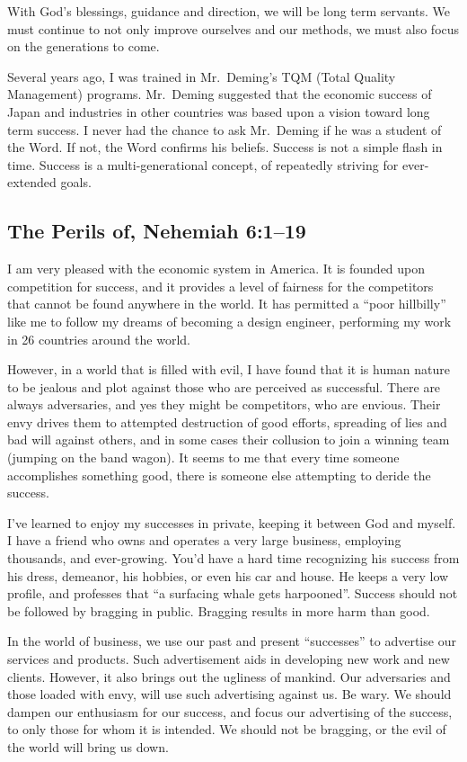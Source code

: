 \documentclass[12pt]{memoir}
\begin{document}
With God's blessings, guidance and direction, we will be long term
servants. We must continue to not only improve ourselves and our methods,
we must also focus on the generations to come.

Several years ago, I was trained in Mr.\ Deming's \textsc{TQM} (Total Quality
Management) programs. Mr.\ Deming suggested that the economic success
of Japan and industries in other countries was based upon a vision
toward long term success. I never had the chance to ask Mr.\ Deming
if he was a student of the Word. If not, the Word confirms his beliefs.
Success is not a simple flash in time. Success is a multi-generational concept, of repeatedly striving for ever-extended goals.

\subsection{The Perils of, Nehemiah 6:1--19}

I am very pleased with the economic system in America. It is founded
upon competition for success, and it provides a level of fairness
for the competitors that cannot be found anywhere in the world. It
has permitted a ``poor hillbilly'' like me to follow my dreams of
becoming a design engineer, performing my work in 26 countries around
the world.

However, in a world that is filled with evil, I have found that it
is human nature to be jealous and plot against those who are perceived
as successful. There are always adversaries, and yes they might be
competitors, who are envious. Their envy drives them to attempted
destruction of good efforts, spreading of lies and bad will against
others, and in some cases their collusion to join a winning team (jumping
on the band wagon). It seems to me that every time someone accomplishes
something good, there is someone else attempting
to deride the success. 

I've learned to enjoy my successes in private, keeping it between
God and myself. I have a friend who owns and operates a very large
business, employing thousands, and ever-growing. You'd have a hard
time recognizing his success from his dress, demeanor, his hobbies,
or even his car and house. He keeps a very low profile, and professes
that ``a surfacing whale gets harpooned''. Success should not be
followed by bragging in public. Bragging results in more harm than
good.

In the world of business, we use our past and present ``successes''
to advertise our services and products. Such advertisement aids in
developing new work and new clients. However, it also brings out the
ugliness of mankind. Our adversaries and those loaded with envy, will
use such advertising against us. Be wary. We should dampen our enthusiasm
for our success, and focus our advertising of the success, to only
those for whom it is intended. We should not be bragging, or the evil
of the world will bring us down.
\end{document}

